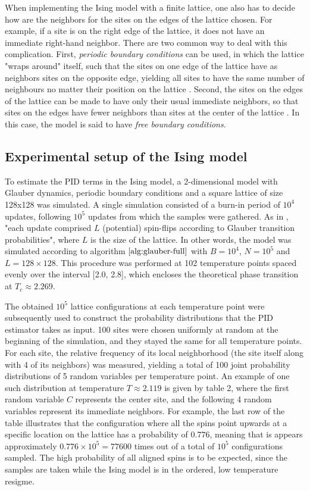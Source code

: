 \documentclass[12pt]{article}
\begin{document}
When implementing the Ising model with a finite lattice, one also has to decide how are the neighbors for the sites on the edges of the lattice chosen. For example, if a site is on the right edge of the lattice, it does not have an immediate right-hand neighbor. There are two common way to deal with this complication. First, \textit{periodic boundary conditions} can be used, in which the lattice "wraps around" itself, such that the sites on one edge of the lattice have as neighbors sites on the opposite edge, yielding all sites to have the same number of neighbours no matter their position on the lattice \cite{spin-models-thesis}. Second, the sites on the edges of the lattice can be made to have only their usual immediate neighbors, so that sites on the edges have fewer neighbors than sites at the center of the lattice \cite{spin-models-thesis}. In this case, the model is said to have \textit{free boundary conditions}.

\subsection{Experimental setup of the Ising model}

To estimate the PID terms in the Ising model, a 2-dimensional model with Glauber dynamics, periodic boundary conditions and a square lattice of size 128x128 was simulated. A single simulation consisted of a burn-in period of $10^4$ updates, following $10^5$ updates from which the samples were gathered. As in \cite{barnett-ising}, "each update comprised $L$ (potential) spin-flips according to Glauber transition probabilities", where $L$ is the size of the lattice. In other words, the model was simulated according to algorithm $\ref{alg:glauber-full}$ with $B=10^4$, $N=10^5$ and $L=128\times128$. This procedure was performed at 102 temperature points spaced evenly over the interval [2.0, 2.8], which encloses the theoretical phase transition at $T_c \approx 2.269$. 

The obtained $10^5$ lattice configurations at each temperature  point were subsequently used to construct the probability distributions that the PID estimator takes as input. 100 sites were chosen uniformly at random at the beginning of the simulation, and they stayed the same for all temperature points. For each site, the relative frequency of its local neighborhood (the site itself along with 4 of its neighbors) was measured, yielding a total of 100 joint probability distributions of 5 random variables per temperature point. An example of one such distribution at temperature $T \approx 2.119$ is given by table 2, where the first random variable $C$ represents the center site, and the following 4 random variables represent its immediate neighbors. For example, the last row of the table illustrates that the configuration where all the spins point upwards at a specific location on the lattice has a probability of $0.776$, meaning that is appears approximately $0.776 \times 10^5 = 77 600$ times out of a total of $10^5$ configurations sampled. The high probability of all aligned spins is to be expected, since the samples are taken while the Ising model is in the ordered, low temperature resigme.
\end{document}
